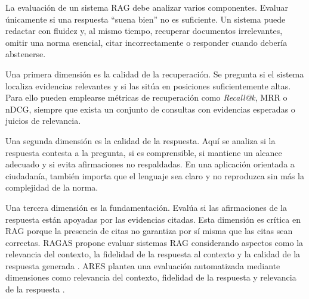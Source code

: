 La evaluación de un sistema RAG debe analizar varios componentes. Evaluar únicamente si una respuesta ``suena bien'' no es suficiente. Un sistema puede redactar con fluidez y, al mismo tiempo, recuperar documentos irrelevantes, omitir una norma esencial, citar incorrectamente o responder cuando debería abstenerse.

Una primera dimensión es la calidad de la recuperación. Se pregunta si el sistema localiza evidencias relevantes y si las sitúa en posiciones suficientemente altas. Para ello pueden emplearse métricas de recuperación como \emph{Recall@k}, MRR o nDCG, siempre que exista un conjunto de consultas con evidencias esperadas o juicios de relevancia.

Una segunda dimensión es la calidad de la respuesta. Aquí se analiza si la respuesta contesta a la pregunta, si es comprensible, si mantiene un alcance adecuado y si evita afirmaciones no respaldadas. En una aplicación orientada a ciudadanía, también importa que el lenguaje sea claro y no reproduzca sin más la complejidad de la norma.

Una tercera dimensión es la fundamentación. Evalúa si las afirmaciones de la respuesta están apoyadas por las evidencias citadas. Esta dimensión es crítica en RAG porque la presencia de citas no garantiza por sí misma que las citas sean correctas. RAGAS propone evaluar sistemas RAG considerando aspectos como la relevancia del contexto, la fidelidad de la respuesta al contexto y la calidad de la respuesta generada \cite{es2024ragas}. ARES plantea una evaluación automatizada mediante dimensiones como relevancia del contexto, fidelidad de la respuesta y relevancia de la respuesta \cite{saadfalcon2024ares}.

